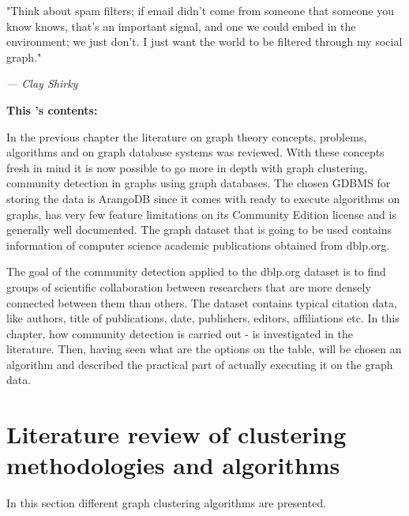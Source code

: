 \begin{figure}[H]%
	\label{fig:\chaptername\thechapter}%
\end{figure}

\vspace*{-5.15cm}
\epigraph{"Think about \gls{spam} filters; if email didn't come from someone that someone you know knows, that's an important signal, and one we could embed in the environment; we just don't. I just want the world to be filtered through my \gls{social graph}."}{\textit{--- Clay Shirky}}

\noindent\large{\textbf{This {\MakeLowercase{\chaptername}}'s contents:}}
\vspace*{-0.8cm}
\minitoc \mtcskip \minilof
\vspace*{-0.5cm}

In the previous chapter the literature on graph theory concepts, problems, algorithms and on graph database systems was reviewed.
With these concepts fresh in mind it is now possible to go more in depth with graph clustering, community detection in graphs using graph databases.
The chosen GDBMS for storing the data is ArangoDB since it comes with ready to execute algorithms on graphs, has very few feature limitations on its \gls{Community Edition} license and is generally well documented.
The graph dataset that is going to be used contains information of computer science academic publications obtained from \gls{dblp.org}.
\medskip

The goal of the community detection applied to the \gls{dblp.org} dataset is to find groups of scientific collaboration between researchers that are more densely connected between them than others.
The dataset contains typical citation data, like authors, title of publications, date, publishers, editors, affiliations etc.
In this chapter, how community detection is carried out - is investigated in the literature. Then, having seen what are the options on the table, will be chosen an algorithm and described the practical part of actually executing it on the graph data.

\section{Literature review of clustering methodologies and algorithms} \label{section:CommunityDetection/Literaturereviewofclusteringmethodologiesandalgorithms}
In this section different graph clustering algorithms are presented.

